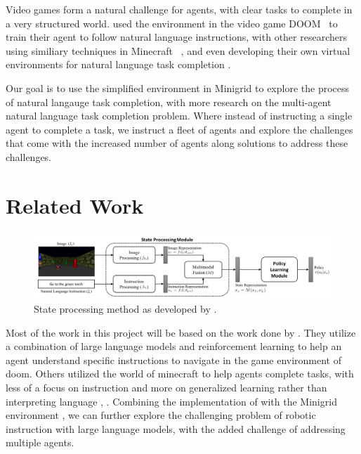 \documentclass[11pt]{article}
\begin{document}
Video games form a natural challenge for agents, with clear tasks to complete in a very structured world. \cite{Chaplot2017} used the environment in the video game DOOM\texttrademark ~ to train their agent to follow natural language instructions, with other researchers using similiary techniques in Minecraft\texttrademark ~ \cite{Tessler2020}, and even developing their own virtual environments for natural language task completion \cite{Anderson2017} \cite{Wang2024}. 

Our goal is to use the simplified environment in Minigrid \cite{MinigridMiniworld23} to explore the process of natural langauge task completion, with more research on the multi-agent natural language task completion problem. Where instead of instructing a single agent to complete a task, we instruct a fleet of agents and explore the challenges that come with the increased number of agents along solutions to address these challenges. 

\section{Related Work}
\begin{figure}[!t]
  \centering
  \includegraphics[width=\linewidth]{figs/stateprocessing.png}
  \caption{State processing method as developed by \cite{Chaplot2017}.}
  \label{fig:stateprocess}
\end{figure}

Most of the work in this project will be based on the work done by \cite{Chaplot2017}. They utilize a combination of large language models and reinforcement learning to help an agent understand specific instructions to navigate in the game environment of doom. Others utilized the world of minecraft to help agents complete tasks, with less of a focus on instruction and more on generalized learning rather than interpreting language \cite{Oh2017}, \cite{Tessler2020}. Combining the implementation of \cite{Chaplot2017} with the Minigrid environment \cite{MinigridMiniworld23}, \cite{chevalier2018babyai} we can further explore the challenging problem of robotic instruction with large language models, with the added challenge of addressing multiple agents.
\end{document}
